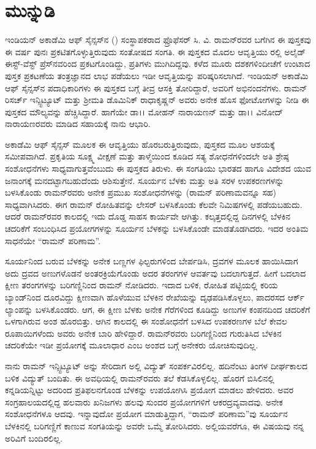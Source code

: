 
\chapter*{ಮುನ್ನುಡಿ}

ಇಂಡಿಯನ್ ಅಕಾಡೆಮಿ ಆಫ್ ಸೈನ್ಸಸ್‍ನ () ಸಂಸ್ಥಾಪಕರಾದ ಫ್ರೊಫೆಸರ್ ಸಿ. ವಿ. ರಾಮನ್‍ರವರ ಬಗೆಗಿನ ಈ ಪುಸ್ತಕವು ಈ ವರ್ಷ ಪುನಃ ಪ್ರಕಟಿತಗೊಳ್ಳುತ್ತಿರುವುದು ಸಂತೋಷದ ಸಂಗತಿ. ಈ ಪುಸ್ತಕದ ಮೊದಲ ಆವೃತ್ತಿಯು ರಲ್ಲಿ ಅಲೈಡ್ ಈಸ್ಟ್-ವೆಸ್ಟ್ ಪ್ರೆಸ್‍ನವರಿಂದ ಪ್ರಕಟಗೊಂಡಿದ್ದು, ಪ್ರತಿಗಳು ಮುಗಿದಿದ್ದವು. ಕಳೆದ ಮೂರು ದಶಕಗಳಿಂದೀಚೆಗೆ ಉಂಟಾದ ಪುಸ್ತಕ ಪ್ರಕಟಣೆಯ ತಂತ್ರಜ್ಞಾನದ ಲಾಭ ಪಡೆಯಲು ಇಡೀ ಆವೃತ್ತಿಯನ್ನು ಪರಿಷ್ಕರಿಸಲಾಗಿದೆ. ಇಂಡಿಯನ್ ಅಕಾಡೆಮಿ ಆಫ್ ಸೈನ್ಸಸ್‍ನ ಪದಾಧಿಕಾರಿಗಳು ಈ ಪುಸ್ತಕದ ಬಗ್ಗೆ ತೀವ್ರ ಆಸಕ್ತಿ ತೋರಿದ್ದಾರೆ, ಅವರಿಗೆ ಅಭಿನಂದನೆಗಳು. ರಾಮನ್ ರಿಸರ್ಚ್ ಇನ್ಸ್ಟಿಟ್ಯೂಟ್ ಮತ್ತು ಶ‍್ರೀಮತಿ ಡೊಮಿನಿಕ್ ರಾಧಾಕೃಷ್ಣನ್ ಅವರು ಅನೇಕ ಹೊಸ ಫೋಟೋಗಳನ್ನು ನೀಡಿ ಈ ಪುಸ್ತಕದ ಮೌಲ್ಯವನ್ನು ಹೆಚ್ಚಿಸಿದ್ದಾರೆ. ಹಾಗೆಯೇ ಡಾ।। ಮೋಹನ್ ನಾರಾಯಣನ್ ಮತ್ತು ಡಾ।। ವಿನೋದ್ ನಾರಾಯಣರವರು ಮಾಡಿದ ಸಹಾಯಕ್ಕೆ ನಾನು ಆಭಾರಿ.

ಅಕಾಡೆಮಿ ಆಫ್ ಸೈನ್ಸಸ್ ಮೂಲಕ ಈ ಆವೃತ್ತಿಯು ಹೊರಬರುತ್ತಿರುವುದು, ಪುಸ್ತಕದ ಮೂಲ ಆಶಯಕ್ಕೆ ಸಮೀಪವಾಗಿದೆ. ಪ್ರಕೃತಿಯ ಸೂಕ್ಷ್ಮ ವೀಕ್ಷಣೆ ಮತ್ತು ತಾಳ್ಮೆಯಿಂದ ಕೂಡಿದ ಸತ್ಯ ಶೋಧನೆಗಳಿಂದಲೇ ಅತಿ ಶ್ರೇಷ್ಠ ಸಂಶೋಧನೆಗಳು ಸಾಧ್ಯವಾಗುತ್ತವೆಂಬುದು ಈ ಪುಸ್ತಕದ ತಿರುಳು. ಈ ಸಂಗತಿಯು ಭಾರತದ ಹಾಗೂ ವಿದೇಶದ ಯುವ ಜನಾಂಗಕ್ಕೆ ಮನದಟ್ಟಾಗಬಹುದೆಂದು ಆಶಿಸುತ್ತೇನೆ. ಸೂರ್ಯನ ಬೆಳಕು ಮತ್ತು ಅತಿ ಸರಳ ಉಪಕರಣಗಳನ್ನು ಬಳಸಿಕೊಂಡು ರಾಮನ್‍ರವರು ಅನೇಕ ಪ್ರಮುಖ ಸಂಶೋಧನೆಗಳನ್ನು (ರಾಮನ್ ಪರಿಣಾಮವನ್ನೂ ಸಹ) ಸಾಧ್ಯವಾಗಿಸಿದರು. ಈಗ ರಾಮನ್ ರೋಹಿತವನ್ನು  ಲೇಸರ್ ಬಳಸಿಕೊಂಡು ಕೆಲವೇ ನಿಮಿಷಗಳಲ್ಲಿ ಪಡೆಯಬಹುದು. ಆದರೆ ರಾಮನ್‍ರವರ ಕಾಲದಲ್ಲಿ ಇದು ದೊಡ್ಡ ಸಾಹಸ ಕಾರ್ಯವೇ ಆಗಿತ್ತು. ಕಲ್ಕತ್ತದಲ್ಲಿದ್ದ ದಿನಗಳಲ್ಲಿ ಬೆಳಕಿನ ಚದರಿಕೆಗೆ ಸಂಬಂಧಿಸಿದ ಪ್ರಯೋಗಗಳನ್ನು ಸೂರ್ಯನ ಬೆಳಕನ್ನು ಬಳಸಿಕೊಂಡೇ ಮಾಡತೊಡಗಿದರು. ಇದರ ಅಂತಿಮ ಸಾಧನೆಯೇ “ರಾಮನ್ ಪರಿಣಾಮ”.

ಸೂರ್ಯನಿಂದ ಬರುವ ಬೆಳಕನ್ನು ಅನೇಕ ಬಣ್ಣಗಳ ಫಿಲ್ಟರುಗಳಿಂದ ಬೇರ್ಪಡಿಸಿ, ದ್ರವಗಳ ಮೂಲಕ ಹಾಯಿಸಿದಾಗ ಅದು ದ್ರವದ ಅಣುಗಳೊಡನೆ ಅಂತರಕ್ರಿಯೆಗೊಂಡು ಅದರ ತರಂಗಗಳ ಆವರ್ತವು ಬದಲಾಗುತ್ತದೆ. ಹೀಗೆ ಬದಲಾದ ಕ್ಷೀಣ ತರಂಗಗಳನ್ನು ಬರಿಗಣ್ಣಿನಿಂದ ರಾಮನ್ ನೋಡಿದರು. ಇದಾದ ಬಳಿಕ, ರೋಹಿತ ಪಟ್ಟಿಯಲ್ಲಿ ಕರಿಯ ಬ್ಯಾಂಡ್‍ನಿಂದ ದೂರವಿದ್ದು ಕ್ಷೀಣವಾಗಿ ಹೊಳೆಯುವ ಬೆಳಕಿನ ರೇಖೆಯನ್ನು ದೃಢಪಡಿಸಿಕೊಳ್ಳಲು, ಪಾದರಸದ ಆರ್ಕ್ ಲ್ಯಾಂಪನ್ನು ಬಳಸಿಕೊಂಡರು. ಆಗ, ಈ ಕ್ಷೀಣ ಬೆಳಕು ಅನೇಕ ಗೆರೆಗಳಿಂದ ಕೂಡಿದ್ದು ಅಣುಗಳ ಕಂಪನದಿಂದ ಚದರಿಕೆಗೆ ಒಳಗಾಗಿರುವ ಅಂಶ ಹೊರಬಿತ್ತು. ಆಗಿನ ಕಾಲದಲ್ಲಿ ಈ ಸಂಶೋಧನೆಗೆ ಬಳಸಿದ ಉಪಕರಣಗಳ ಬೆಲೆ ಕೇವಲ  ರೂಪಾಯಿಗಳೆಂದು ಅವರು ಅನೇಕ ಬಾರಿ ಹೇಳಿದ್ದಾರೆ. ರಾಮನ್‍ರವರು ಬರಿಗಣ್ಣಿನಿಂದ ಗುರುತಿಸಿದ ಬೆಳಕಿನ ಚದರಿಕೆಯೇ ಇಡೀ ಪ್ರಯೋಗಕ್ಕೆ ಮೂಲಾಧಾರ ಎಂಬ ಅಂಶದ ಬಗ್ಗೆ ಅನೇಕರು ಯೋಚಿಸುವುದಿಲ್ಲ.

ನಾನು ರಾಮನ್ ಇನ್ಸ್ಟಿಟ್ಯೂಟ್ ಅನ್ನು ಸೇರಿದಾಗ ಅಲ್ಲಿ ವಿದ್ಯುತ್ ಸಂಪರ್ಕವಿರಲಿಲ್ಲ. ಹದಿನೆಂಟು ತಿಂಗಳ ದೀರ್ಘಕಾಲದ ಬಳಿಕ ವಿದ್ಯುತ್ ಬಂದಿತು. ಈ ಅವಧಿಯಲ್ಲಿ ರಾಮನ್‍ರವರು ತಲೆ ಕೆಡಸಿಕೊಳ್ಳಲಿಲ್ಲ. ಹೊರಗೆ ಬಿಸಿಲಿನಲ್ಲಿ ಕನ್ನಡಿಯನ್ನಿಟ್ಟು ಅದರಿಂದ ಪ್ರತಿಫಲನಗೊಂಡ ಬೆಳಕನ್ನು ಉಪಯೋಗಿಸಿ ಪ್ರಯೋಗ ಮಾಡಲು ಹೇಳಿದರು. ಅವರ ಸಂಗ್ರಹಾಲಯದಲ್ಲಿದ್ದ ಹಲವಾರು ಖನಿಜಗಳು ಹಲವು ಸುಂದರ ಪ್ರಯೋಗಗಳಿಗೆ ಆಕರದ್ರವ್ಯವಾದವು. ಅನೇಕ ಸಂಶೋಧನೆಗಳೂ ಆದವು. ಇನ್ನಾವುದೋ ಪ್ರಯೋಗ ಮಾಡುತ್ತಿದ್ದಾಗ, “ರಾಮನ್ ಪರಿಣಾಮ”ವು ಸೂರ್ಯನ ಬೆಳಕಿನಲ್ಲಿ ಬರಿಗಣ್ಣಿಗೆ ಕಾಣುವ ಸಂಗತಿಯನ್ನು ಅವರೇ ಒಮ್ಮೆ ತೋರಿಸಿದರು. ಅಲ್ಲಿಯವರೆಗೂ, ಈ ವಿಷಯವು ನನ್ನ ಅರಿವಿಗೆ ಬಂದಿರಲಿಲ್ಲ.

